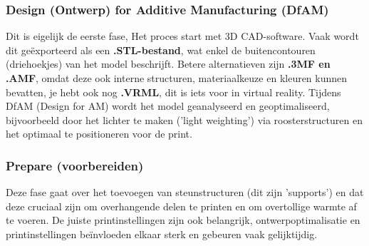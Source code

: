 \subsubsection{Design (Ontwerp) for Additive Manufacturing (DfAM)}
Dit is eigelijk de eerste fase, Het proces start met 3D CAD-software. Vaak wordt dit geëxporteerd als een \textbf{.STL-bestand}, wat enkel de buitencontouren (driehoekjes) van het model beschrijft. Betere alternatieven zijn \textbf{.3MF en .AMF}, omdat deze ook interne structuren, materiaalkeuze en kleuren kunnen bevatten, je hebt ook nog \textbf{.VRML}, dit is iets voor in virtual reality. Tijdens DfAM (Design for AM) wordt het model geanalyseerd en geoptimaliseerd, bijvoorbeeld door het lichter te maken ('light weighting') via roosterstructuren en het optimaal te positioneren voor de print.
\subsubsection{Prepare (voorbereiden)}
Deze fase gaat over het toevoegen van steunstructuren (dit zijn 'supports') en dat deze cruciaal zijn om overhangende delen te printen en om overtollige warmte af te voeren. De juiste printinstellingen zijn ook belangrijk, ontwerpoptimalisatie en printinstellingen beïnvloeden elkaar sterk en gebeuren vaak gelijktijdig.
